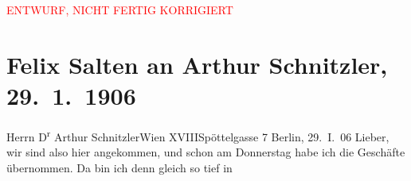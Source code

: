 
\begin{center}
            \textcolor{red}{ENTWURF, NICHT FERTIG KORRIGIERT}
                      \end{center}
            
         
         \renewcommand{\erwaehntePersonen}{Personen: Otto Brahm, Anna Katharina Rehmann, Ottilie Salten, Paul Salten, Olga Schnitzler, Heinrich Schnitzler}
         \renewcommand{\erwaehnteInstitutionen}{Institutionen: Theater des Westens}
         \renewcommand{\erwaehnteOrte}{Orte: Berlin, Charlottenburg, Edmund-Weiß-Gasse, Hotel Saxonia, Kantstraße, Potsdamer Platz, Wien, XVIII., Währing}
         \renewcommand{\erwaehnteWerke}{}
               \section[Felix Salten an Arthur Schnitzler, 29. 1. 1906]{ Felix Salten an Arthur Schnitzler, 29. 1. 1906}\nopagebreak{}\rehead{ }\begin{ledgroupsized}[t]{13cm}\normalsize\beginnumbering \toendnotes[C]{\smallbreak\pagebreak[2]} 
\toendnotes[C]{\smallbreak}\pstart{}{\pb}Herrn D\textsuperscript{r} Arthur Schnitzler\pend{}\pstart{}Wien XVIII\pend{}\pstart{}Spöttelgasse 7\pend{}{\bigskip}\pstart
           \raggedleft{}{\pb}Berlin, 29. I. 06\pend
           \pstart
           Lieber, wir sind also \label{K_L03413-1v}\label{K_L03413-1h} hier angekommen, und schon am
               Donnerstag habe ich die Geschäfte übernommen. Da bin ich denn gleich so tief in

\end{ledgroupsized}
